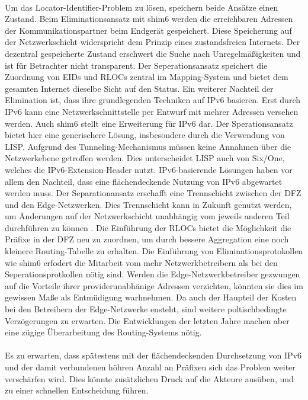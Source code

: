 \paragraph{}
Um das Locator-Identifier-Problem zu lösen, speichern beide Ansätze einen Zustand. Beim Eliminationsansatz mit shim6 werden die erreichbaren Adressen der Kommunikationspartner beim Endgerät gespeichert. Diese Speicherung auf der Netzwerkschicht widerspricht dem Prinzip eines zustandsfreien Internets. Der dezentral gespeicherte Zustand erschwert die Suche nach Unregelmäßigkeiten und ist für Betrachter nicht transparent. Der Seperationsansatz speichert die Zuordnung von EIDs und RLOCs zentral im Mapping-System und bietet dem gesamten Internet dieselbe Sicht auf den Status.
Ein weiterer Nachteil der Elimination ist, dass ihre grundlegenden Techniken auf IPv6 basieren. Erst durch IPv6 kann eine Netzwerkschnittstelle per Entwurf mit mehrer Adressen versehen werden. Auch shim6 stellt eine Erweiterung für IPv6 dar. Der Sperationsansatz bietet hier eine generischere Lösung, insbesondere durch die Verwendung von LISP. Aufgrund des Tunneling-Mechanismus müssen keine Annahmen über die Netzwerkebene getroffen werden. Dies unterscheidet LISP auch von Six/One, welches die IPv6-Extension-Header nutzt. IPv6-basierende Lösungen haben vor allem den Nachteil, dass eine flächendeckende Nutzung von IPv6 abgewartet werden muss. 
Der Separationansatz erschafft eine Trennschicht zwischen der DFZ und den Edge-Netzwerken. Dies Trennschicht kann in Zukunft genutzt werden, um Änderungen auf der Netzwerkschicht unabhängig vom jeweils anderen Teil durchführen zu können \cite{jen:2008:start}.
Die Einführung der RLOCs bietet die Möglichkeit die Präfixe in der DFZ neu zu zuordnen, um durch bessere Aggregation eine noch kleinere Routing-Tabelle zu erhalten. 
Die Einführung von Eliminationsprotokollen wie shim6 erfodert die Mitarbeit vom mehr Netzwerkbetreibern als bei den Seperationsprotkollen nötig sind. Werden die Edge-Netzwerkbetreiber gezwungen auf die Vorteile ihrer providerunabhänige Adressen verzichten, könnten sie dies im gewissen Maße als Entmüdigung warhnehmen. Da auch der Haupteil der Kosten bei den Betreibern der Edge-Netzwerke ensteht, sind weitere poltischbedingte Verzögerungen zu erwarten. Die Entwicklungen der letzten Jahre machen aber eine zügige Überarbeitung des Routing-Systems nötig.

\paragraph{}
Es zu erwarten, dass spätestens mit der flächendeckenden Durchsetzung von IPv6 und der damit verbundenen höhren Anzahl an Präfixen sich das Problem weiter verschärfen wird. Dies könnte zusätzlichen Druck auf die Akteure ausüben, und zu einer schnellen Entscheidung führen.
